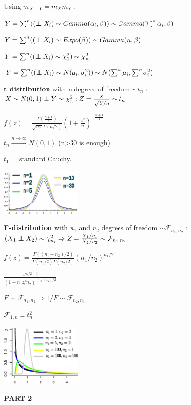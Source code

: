 \documentclass[a4paper,10.5pt]{article}
\newcommand\independent{\protect\mathpalette{\protect\independenT}{\perp}}
\def\independenT#1#2{\mathrel{\rlap{$#1#2$}\mkern2mu{#1#2}}}
\begin{document}
\begin{multicols}{4}
		Using $m_{X+Y}=m_Xm_Y$ :
		
		$Y = \sum^n ((\independent X_i) \sim Gamma(\alpha_i,\beta)) \sim Gamma(\sum^n\alpha_i,\beta)$
		
		$Y = \sum^n ((\independent X_i) \sim Expo(\beta)) \sim Gamma(n,\beta)$
		
		$Y = \sum^n ((\independent X_i) \sim \chi_1^2) \sim \chi_n^2$
		
		$Y = \sum^n ((\independent X_i) \sim N(\mu_i,\sigma_i^2)) \sim N(\sum^n \mu_i, \sum^n \sigma_i^2)$
		
		\textbf{t-distribution} with n degrees of freedom $\sim t_n$ : $X\sim N(0,1) \independent Y\sim\chi_n^2 : Z = \frac{X}{\sqrt{Y/n}} \sim t_n$
		
		$f(z) = \frac{\Gamma(\frac{n+1}{2})}{\sqrt{n\pi}\Gamma(n/2)}\left(1+\frac{z^2}{n}\right)^{-\frac{n+1}{2}}$
		
		$t_n \overset{n\to\infty}\longrightarrow N(0,1)$ (n>30 is enough)
		
		$t_1$ = standard Cauchy.
		
		\includegraphics[width=4cm]{img/t.PNG}
		
		\textbf{F-distribution} with $n_1$ and $n_2$ degrees of freedom $\sim \mathcal{F}_{n_1,n_2}$ : $(X_1\independent X_2) \sim \chi_{n_i}^2 \Rightarrow Z = \frac{X_1/n_1}{X_2/n_2} \sim \mathcal{F}_{n_1,n_2}$
		
		$f(z) = \frac{\Gamma((n_1+n_2)/2)}{\Gamma(n_1/2)\Gamma(n_2/2)} (n_1/n_2)^{n_1/2}$
		
		$\frac{z^{n_1/2-1}}{(1+n_1z/n_2)^{(n_1+n_2)/2}}$
		
		$F\sim \mathcal{F}_{n_1,n_2} \Rightarrow 1/F \sim \mathcal{F}_{n_2,n_1}$
		
		$\mathcal{F}_{1,n} \equiv t_n^2$
		
		\includegraphics[width=4cm]{img/f.png}
		
		\textbf{PART 2}
		

\end{multicols}
\end{document}
